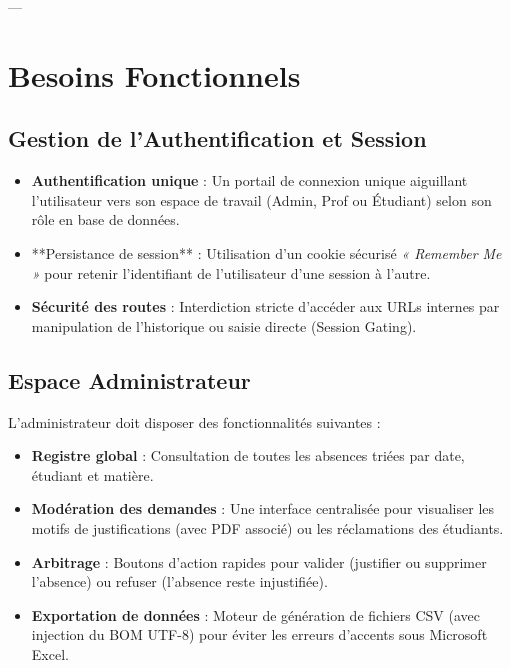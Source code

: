 \documentclass[12pt,a4paper]{article}
\begin{document}
---

\section{Besoins Fonctionnels}

\subsection{Gestion de l'Authentification et Session}
\begin{itemize}
    \item \textbf{Authentification unique} : Un portail de connexion unique aiguillant l'utilisateur vers son espace de travail (Admin, Prof ou Étudiant) selon son rôle en base de données.
    \item **Persistance de session** : Utilisation d'un cookie sécurisé \textit{« Remember Me »} pour retenir l'identifiant de l'utilisateur d'une session à l'autre.
    \item \textbf{Sécurité des routes} : Interdiction stricte d'accéder aux URLs internes par manipulation de l'historique ou saisie directe (Session Gating).
\end{itemize}

\subsection{Espace Administrateur}
L'administrateur doit disposer des fonctionnalités suivantes :
\begin{itemize}
    \item \textbf{Registre global} : Consultation de toutes les absences triées par date, étudiant et matière.
    \item \textbf{Modération des demandes} : Une interface centralisée pour visualiser les motifs de justifications (avec PDF associé) ou les réclamations des étudiants.
    \item \textbf{Arbitrage} : Boutons d'action rapides pour valider (justifier ou supprimer l'absence) ou refuser (l'absence reste injustifiée).
    \item \textbf{Exportation de données} : Moteur de génération de fichiers CSV (avec injection du BOM UTF-8) pour éviter les erreurs d'accents sous Microsoft Excel.
\end{itemize}
\end{document}
